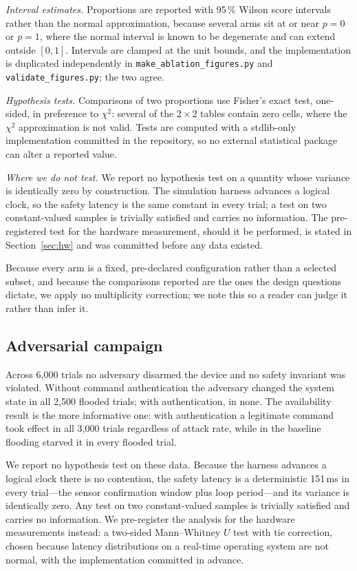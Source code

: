 \emph{Interval estimates.} Proportions are reported with 95\,\% Wilson score intervals rather
than the normal approximation, because several arms sit at or near $p=0$ or $p=1$, where the
normal interval is known to be degenerate and can extend outside $[0,1]$. Intervals are clamped
at the unit bounds, and the implementation is duplicated independently in
\texttt{make\_ablation\_figures.py} and \texttt{validate\_figures.py}; the two agree.

\emph{Hypothesis tests.} Comparisons of two proportions use Fisher's exact test, one-sided, in
preference to $\chi^2$: several of the $2\times2$ tables contain zero cells, where the
$\chi^2$ approximation is not valid. Tests are computed with a stdlib-only implementation
committed in the repository, so no external statistical package can alter a reported value.

\emph{Where we do not test.} We report no hypothesis test on a quantity whose variance is
identically zero by construction. The simulation harness advances a logical clock, so the safety
latency is the same constant in every trial; a test on two constant-valued samples is trivially
satisfied and carries no information. The pre-registered test for the hardware measurement,
should it be performed, is stated in Section~\ref{sec:hw} and was committed before any data
existed.

Because every arm is a fixed, pre-declared configuration rather than a selected subset, and
because the comparisons reported are the ones the design questions dictate, we apply no
multiplicity correction; we note this so a reader can judge it rather than infer it.

\subsection{Adversarial campaign}

Across 6{,}000 trials no adversary disarmed the device and no safety invariant was violated.
Without command authentication the adversary changed the system state in all 2{,}500 flooded
trials; with authentication, in none. The availability result is the more informative one: with
authentication a legitimate command took effect in all 3{,}000 trials regardless of attack rate,
while in the baseline flooding starved it in every flooded trial.

We report no hypothesis test on these data. Because the harness advances a logical clock there
is no contention, the safety latency is a deterministic 151\,ms in every trial---the sensor
confirmation window plus loop period---and its variance is identically zero. Any test on two
constant-valued samples is trivially satisfied and carries no information. We pre-register the
analysis for the hardware measurements instead: a two-sided Mann--Whitney $U$ test with tie
correction, chosen because latency distributions on a real-time operating system are not normal,
with the implementation committed in advance.

